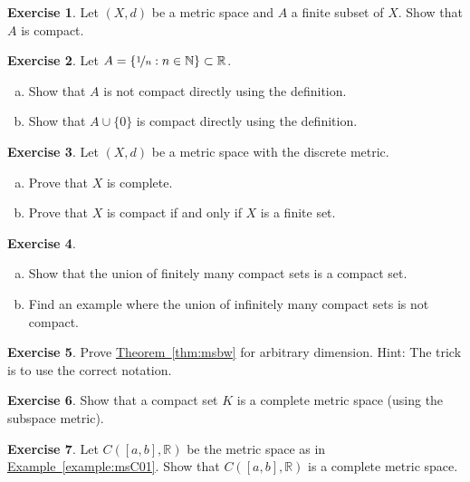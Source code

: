 \documentclass[12pt,openany]{book}
\newcommand{\R}{{\mathbb{R}}}
\newcommand{\N}{{\mathbb{N}}}
\theoremstyle{plain}
\theoremstyle{remark}
\theoremstyle{definition}
\newenvironment{exbox}{%
    \def\FrameCommand{\vrule width 1pt \relax\hspace{10pt}}%
    \MakeFramed{\advance\hsize-\width\FrameRestore}%
}{%
    \endMakeFramed
}
\newenvironment{exparts}{%
    \leavevmode\begin{enumerate}[a),noitemsep,topsep=0pt,parsep=0pt,partopsep=0pt]
}{%
    \end{enumerate}
}
\theoremstyle{exercise}
\newtheorem{exercise}{Exercise}[section]
\theoremstyle{example}
\newcommand{\exampleref}[1]{\hyperref[#1]{Example~\ref*{#1}}}
\newcommand{\thmref}[1]{\hyperref[#1]{Theorem~\ref*{#1}}}
\begin{document}
\begin{exbox}
\begin{exercise}
Let $(X,d)$ be a metric space and $A$ a finite subset of $X$.
Show that $A$ is compact.
\end{exercise}

\begin{samepage}
\begin{exercise}
Let $A = \{ \nicefrac{1}{n} : n \in \N \} \subset \R$.
\begin{exparts}
\item
Show that $A$ is
not compact directly using the definition.
\item
Show that $A \cup \{ 0 \}$ is
compact directly using the definition.
\end{exparts}
\end{exercise}
\end{samepage}


\begin{exercise}
Let $(X,d)$ be a metric space with the discrete metric.
\begin{exparts}
\item
Prove that $X$ is complete.
\item
Prove that $X$ is compact if and only if $X$ is a finite set.
\end{exparts}
\end{exercise}

\begin{exercise}
\begin{exparts}
\item
Show that the union of finitely many compact sets is a compact set.
\item
Find an example where the union of infinitely many compact sets is not
compact.
\end{exparts}
\end{exercise}

\begin{exercise}
Prove \thmref{thm:msbw} for arbitrary dimension.
Hint: The trick is to use the correct notation.
\end{exercise}

\begin{exercise}
Show that a compact set $K$ is a complete metric space (using the subspace
metric).
\end{exercise}

\begin{exercise} \label{exercise:CabRcomplete}
Let $C([a,b],\R)$ be the metric space as in \exampleref{example:msC01}.  Show that
$C([a,b],\R)$ is a complete metric space.
\end{exercise}


\end{exbox}
\end{document}
